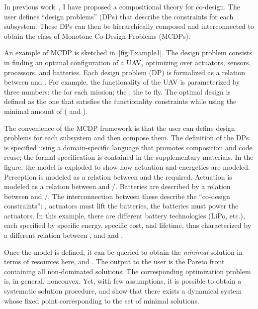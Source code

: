 In previous work~\cite{censi15monotone,censi15same,censi16codesign_sep16},
I have proposed a compositional theory for co-design. The user defines
``design problems'' (DPs) that describe the constraints for each
subsystem. These DPs can then be hierarchically composed and interconnected
to obtain the class of Monotone Co-Design Problems (MCDPs).

An example of MCDP is sketched in~\cref{fig:Example1}. The
design problem consists in finding an optimal configuration of a UAV,
optimizing over actuators, sensors, processors, and batteries. Each
design problem (DP) is formalized as a relation between 
and . For example, the functionality of the UAV is parameterized
by three numbers: the  for each mission; the
; the  to fly. The
optimal design is defined as the one that satisfies the functionality
constraints while using the minimal amount of  (
and ).

The convenience of the MCDP framework is that the user can define
design problems for each subsystem and then compose them. The definition
of the DPs is specified using a domain-specific language that promotes
composition and code reuse; the formal specification is contained
in the supplementary materials. In the figure, the model is exploded
to show how actuation and energetics are modeled. Perception is modeled
as a relation between  and the 
required. Actuation is modeled as a relation between  and
/. Batteries are described by a relation between
 and /. The interconnection between
these describe the ``co-design constraints'': \eg , actuators must
lift the batteries, the batteries must power the actuators. In this
example, there are different battery technologies (LiPo, etc.), each
specified by specific energy, specific cost, and lifetime, thus characterized
by a different relation between , 
and  and .

Once the model is defined, it can be queried to obtain the \emph{minimal}
solution in terms of resources \textemdash{} here, 
and . The output to the user is the Pareto front containing
all non-dominated solutions. The corresponding optimization problem
is, in general, nonconvex. Yet, with few assumptions, it is possible
to obtain a systematic solution procedure, and show that there exists
a dynamical system whose fixed point corresponding to the set of minimal
solutions.


